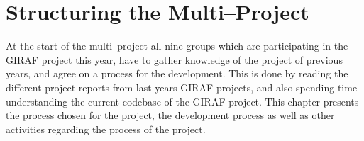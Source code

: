 \chapter{Structuring the Multi--Project}

At the start of the multi--project all nine groups which are participating in the GIRAF project this year, have to gather knowledge of the project of previous years, and agree on a process for the development.
This is done by reading the different project reports from last years GIRAF projects, and also spending time understanding the current codebase of the GIRAF project.
This chapter presents the process chosen for the project, the development process as well as other activities regarding the process of the project.

